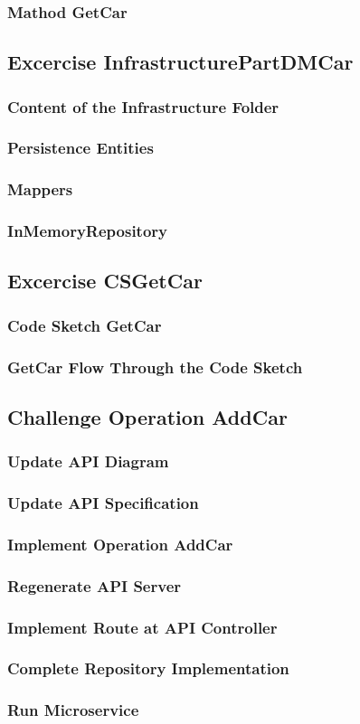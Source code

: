 \subsubsection*{Mathod GetCar}

\subsection{Excercise InfrastructurePartDMCar}
\subsubsection*{Content of the Infrastructure Folder}
\subsubsection*{Persistence Entities}
\subsubsection*{Mappers}
\subsubsection*{InMemoryRepository}


\subsection{Excercise CSGetCar}
\subsubsection*{Code Sketch GetCar}
\subsubsection*{GetCar Flow Through the Code Sketch}


\subsection{Challenge Operation AddCar}
\subsubsection*{Update API Diagram}
\subsubsection*{Update API Specification}
\subsubsection*{Implement Operation AddCar}
\subsubsection*{Regenerate API Server}
\subsubsection*{Implement Route at API Controller}
\subsubsection*{Complete Repository Implementation}
\subsubsection*{Run Microservice}